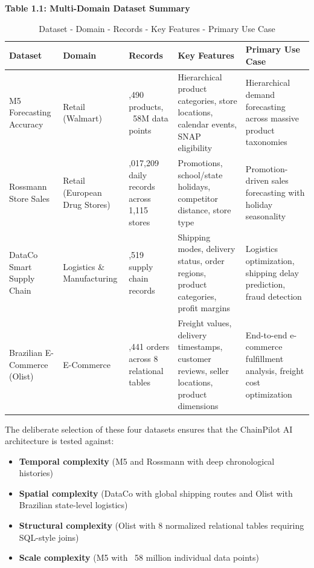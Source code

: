 \documentclass[12pt, a4paper]{report}
\begin{document}
\textbf{Table 1.1: Multi-Domain Dataset Summary}

\begin{table}[H]
\centering
\caption{Dataset - Domain - Records - Key Features - Primary Use Case}
\vspace{0.1in}
\begin{tabularx}{\textwidth}{|>{\raggedright\arraybackslash}X|>{\raggedright\arraybackslash}X|>{\raggedright\arraybackslash}X|>{\raggedright\arraybackslash}X|>{\raggedright\arraybackslash}X|}
\hline
Dataset & Domain & Records & Key Features & Primary Use Case \\ \hline
\hline
M5 Forecasting Accuracy & Retail (Walmart) & 30,490 products, ~58M data points & Hierarchical product categories, store locations, calendar events, SNAP eligibility & Hierarchical demand forecasting across massive product taxonomies \\ \hline
Rossmann Store Sales & Retail (European Drug Stores) & 1,017,209 daily records across 1,115 stores & Promotions, school/state holidays, competitor distance, store type & Promotion-driven sales forecasting with holiday seasonality \\ \hline
DataCo Smart Supply Chain & Logistics \& Manufacturing & 180,519 supply chain records & Shipping modes, delivery status, order regions, product categories, profit margins & Logistics optimization, shipping delay prediction, fraud detection \\ \hline
Brazilian E-Commerce (Olist) & E-Commerce & 99,441 orders across 8 relational tables & Freight values, delivery timestamps, customer reviews, seller locations, product dimensions & End-to-end e-commerce fulfillment analysis, freight cost optimization \\ \hline
\end{tabularx}
\end{table}

The deliberate selection of these four datasets ensures that the ChainPilot AI architecture is tested against:
\begin{itemize}
\item \textbf{Temporal complexity} (M5 and Rossmann with deep chronological histories)
\item \textbf{Spatial complexity} (DataCo with global shipping routes and Olist with Brazilian state-level logistics)
\item \textbf{Structural complexity} (Olist with 8 normalized relational tables requiring SQL-style joins)
\item \textbf{Scale complexity} (M5 with ~58 million individual data points)
\end{itemize}
\end{document}
